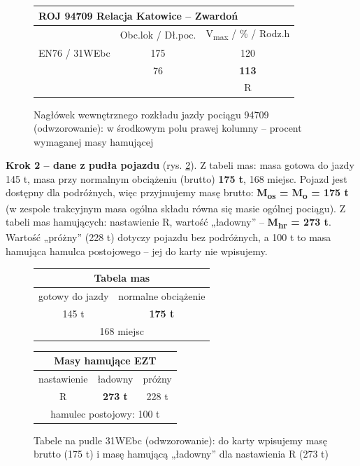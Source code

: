 \begin{figure}[h]
	\centering
	\footnotesize
	\setlength{\tabcolsep}{5pt}
	\begin{tabular}{|l|c|c|}
		\hline
		\multicolumn{3}{|l|}{\textbf{ROJ 94709} Relacja Katowice – Zwardoń} \\
		\hline
		 & Obc.lok / Dł.poc. & V\textsubscript{max} / \% / Rodz.h \\
		\hline
		EN76 / 31WEbc & 175 & 120 \\
		 & 76 & \cellcolor{orange!25}\textbf{113} \\
		 & & R \\
		\hline
	\end{tabular}
	\caption{Nagłówek wewnętrznego rozkładu jazdy pociągu 94709 (odwzorowanie): w środkowym polu prawej kolumny – procent wymaganej masy hamującej}
	\label{fig:karta-rozklad}
\end{figure}

\textbf{Krok 2 – dane z pudła pojazdu} (rys. \ref{fig:karta-pudlo}). Z tabeli mas: masa gotowa do jazdy 145 t, masa przy normalnym obciążeniu (brutto) \textbf{175 t}, 168 miejsc. Pojazd jest dostępny dla podróżnych, więc przyjmujemy masę brutto: \textbf{M\textsubscript{os} = M\textsubscript{o} = 175 t} (w zespole trakcyjnym masa ogólna składu równa się masie ogólnej pociągu). Z tabeli mas hamujących: nastawienie R, wartość „ładowny” – \textbf{M\textsubscript{hr} = 273 t}. Wartość „próżny” (228 t) dotyczy pojazdu bez podróżnych, a 100 t to masa hamująca hamulca postojowego – jej do karty nie wpisujemy.

\begin{figure}[h]
	\centering
	\footnotesize
	\setlength{\tabcolsep}{5pt}
	\begin{tabular}{|c|c|}
		\hline
		\multicolumn{2}{|c|}{\textbf{Tabela mas}} \\
		\hline
		gotowy do jazdy & normalne obciążenie \\
		145 t & \cellcolor{orange!25}\textbf{175 t} \\
		\hline
		\multicolumn{2}{|c|}{168 miejsc} \\
		\hline
	\end{tabular}
	\hspace{6mm}
	\begin{tabular}{|c|c|c|}
		\hline
		\multicolumn{3}{|c|}{\textbf{Masy hamujące EZT}} \\
		\hline
		nastawienie & ładowny & próżny \\
		\hline
		R & \cellcolor{orange!25}\textbf{273 t} & 228 t \\
		\hline
		\multicolumn{3}{|c|}{hamulec postojowy: 100 t} \\
		\hline
	\end{tabular}
	\caption{Tabele na pudle 31WEbc (odwzorowanie): do karty wpisujemy masę brutto (175 t) i masę hamującą „ładowny” dla nastawienia R (273 t)}
	\label{fig:karta-pudlo}
\end{figure}

